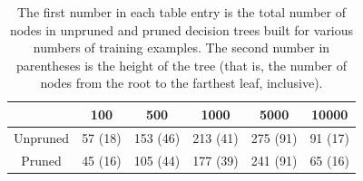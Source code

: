 \begin{table}
    \centering
    \begin{tabular}{c|ccccc}
        & 100 & 500 & 1000 & 5000 & 10000 \\
        \hline
        Unpruned & 57 (18) & 153 (46) & 213 (41) & 275 (91) & 91 (17) \\
        Pruned  & 45 (16) & 105 (44)  & 177 (39) & 241 (91) & 65 (16) \\
    \end{tabular}
    \caption{The first number in each table entry is the total number of nodes in unpruned and pruned decision trees built for various numbers of training examples. The second number in parentheses is the height of the tree (that is, the number of nodes from the root to the farthest leaf, inclusive).}
    \label{table:dt_sizes}
\end{table}
